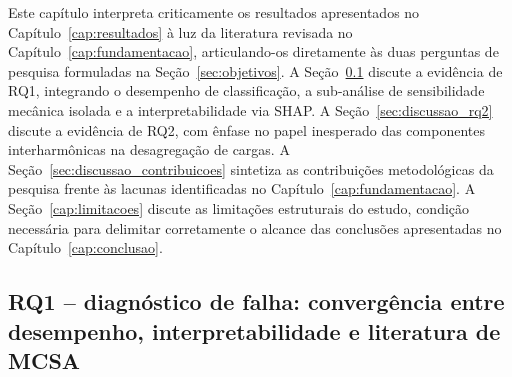 \documentclass[times,final]{elsarticle}
\begin{document}
Este capítulo interpreta criticamente os resultados apresentados no Capítulo~\ref{cap:resultados} à luz da literatura revisada no Capítulo~\ref{cap:fundamentacao}, articulando-os diretamente às duas perguntas de pesquisa formuladas na Seção~\ref{sec:objetivos}. A Seção~\ref{sec:discussao_rq1} discute a evidência de RQ1, integrando o desempenho de classificação, a sub-análise de sensibilidade mecânica isolada e a interpretabilidade via SHAP. A Seção~\ref{sec:discussao_rq2} discute a evidência de RQ2, com ênfase no papel inesperado das componentes interharmônicas na desagregação de cargas. A Seção~\ref{sec:discussao_contribuicoes} sintetiza as contribuições metodológicas da pesquisa frente às lacunas identificadas no Capítulo~\ref{cap:fundamentacao}. A Seção~\ref{cap:limitacoes} discute as limitações estruturais do estudo, condição necessária para delimitar corretamente o alcance das conclusões apresentadas no Capítulo~\ref{cap:conclusao}.

\subsection{RQ1 -- diagnóstico de falha: convergência entre desempenho, interpretabilidade e literatura de MCSA}
\label{sec:discussao_rq1}
\end{document}
